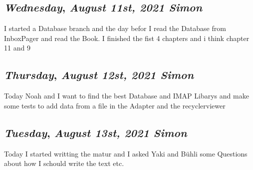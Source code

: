 \begin{center}
\section*{\month}
\end{center}


\def\day{\textit{August 11st, 2021 Simon}}
\def\weekday{\textit{Wednesday}}
\subsection*{\weekday, \day}

I started a Database branch and the day befor I read the Database from InboxPager and read the Book. 
I finished the fist 4 chapters and i think chapter 11 and 9



\def\day{\textit{August 12st, 2021 Simon}}
\def\weekday{\textit{Thursday}}
\subsection*{\weekday, \day}

Today Noah and I want to find the best Database and IMAP Libarys 
and make some tests to add data from a file in the Adapter and the recyclerviewer


\def\day{\textit{August 13st, 2021 Simon}}
\def\weekday{\textit{Tuesday}}
\subsection*{\weekday, \day}

Today I started writting the matur and I asked Yaki and Bühli some Questions about 
how I schould write the text etc. 
